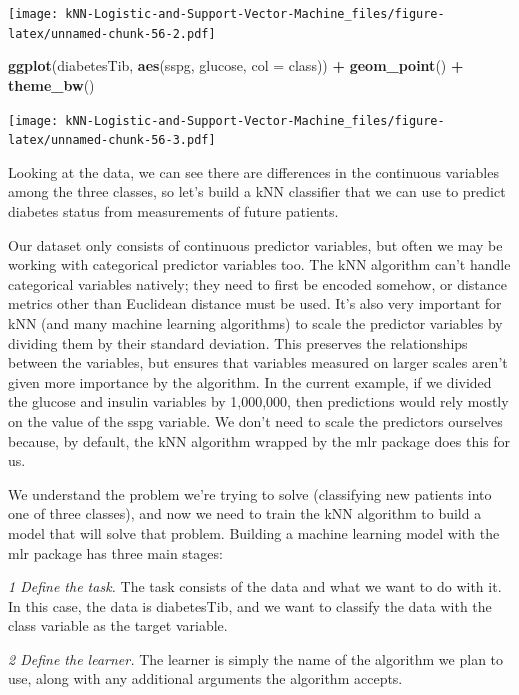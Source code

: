 \documentclass[
]{article}
\newenvironment{Shaded}{\begin{snugshade}}{\end{snugshade}}
\newcommand{\AttributeTok}[1]{\textcolor[rgb]{0.13,0.29,0.53}{#1}}
\newcommand{\FunctionTok}[1]{\textcolor[rgb]{0.13,0.29,0.53}{\textbf{#1}}}
\newcommand{\NormalTok}[1]{#1}
\newcommand{\SpecialCharTok}[1]{\textcolor[rgb]{0.81,0.36,0.00}{\textbf{#1}}}
\begin{document}
\texttt{[image: kNN-Logistic-and-Support-Vector-Machine\_files/figure-latex/unnamed-chunk-56-2.pdf]}

\begin{Shaded}
\begin{Highlighting}[]
\FunctionTok{ggplot}\NormalTok{(diabetesTib, }\FunctionTok{aes}\NormalTok{(sspg, glucose, }\AttributeTok{col =}\NormalTok{ class)) }\SpecialCharTok{+}
  \FunctionTok{geom\_point}\NormalTok{() }\SpecialCharTok{+}
  \FunctionTok{theme\_bw}\NormalTok{()}
\end{Highlighting}
\end{Shaded}

\texttt{[image: kNN-Logistic-and-Support-Vector-Machine\_files/figure-latex/unnamed-chunk-56-3.pdf]}

Looking at the data, we can see there are differences in the continuous
variables among the three classes, so let's build a kNN classifier that
we can use to predict diabetes status from measurements of future
patients.

Our dataset only consists of continuous predictor variables, but often
we may be working with categorical predictor variables too. The kNN
algorithm can't handle categorical variables natively; they need to
first be encoded somehow, or distance metrics other than Euclidean
distance must be used. It's also very important for kNN (and many
machine learning algorithms) to scale the predictor variables by
dividing them by their standard deviation. This preserves the
relationships between the variables, but ensures that variables measured
on larger scales aren't given more importance by the algorithm. In the
current example, if we divided the glucose and insulin variables by
1,000,000, then predictions would rely mostly on the value of the sspg
variable. We don't need to scale the predictors ourselves because, by
default, the kNN algorithm wrapped by the mlr package does this for us.

We understand the problem we're trying to solve (classifying new
patients into one of three classes), and now we need to train the kNN
algorithm to build a model that will solve that problem. Building a
machine learning model with the mlr package has three main stages:

\emph{1 Define the task.} The task consists of the data and what we want
to do with it. In this case, the data is diabetesTib, and we want to
classify the data with the class variable as the target variable.

\emph{2 Define the learner.} The learner is simply the name of the
algorithm we plan to use, along with any additional arguments the
algorithm accepts.
\end{document}
